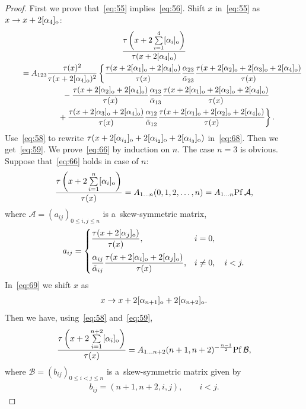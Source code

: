 \documentclass[11pt]{article}
\begin{document}
\begin{proof}
First we prove that~\eqref{eq:55} implies~\eqref{eq:56}.
Shift $x$ in~\eqref{eq:55} as $x\rightarrow x+2[\alpha_4]_{\rm o}$:
\begin{gather}
\frac{\tau\left(x+2\sum\limits_{i=1}^{4}[\alpha_i]_{\rm o}\right)}{\tau(x+2[\alpha_4]_{\rm o})}\nonumber\\
\qquad{}
=A_{123}\frac{\tau(x)^2}{\tau(x+2[\alpha_4]_{\rm o})^2}\left\{\frac{\tau(x+2[\alpha_1]_{\rm o}+2[\alpha_4]_{\rm o})}{\tau(x)}
\frac{\alpha_{23}}{\tilde{\alpha}_{23}}\frac{\tau(x+2[\alpha_2]_{\rm o}+2[\alpha_3]_{\rm o}+2[\alpha_4]_{\rm o})}{\tau(x)}
\right.
\nonumber
\\
\qquad\quad{} -\frac{\tau(x+2[\alpha_2]_{\rm o}+2[\alpha_4]_{\rm o})}{\tau(x)}\frac{\alpha_{13}}{\tilde{\alpha}_{13}}
\frac{\tau(x+2[\alpha_1]_{\rm o}+2[\alpha_3]_{\rm o}+2[\alpha_4]_{\rm o})}{\tau(x)}\nonumber
\\
 \left.
 \qquad\quad{} +\frac{\tau(x+2[\alpha_3]_{\rm o}+2[\alpha_4]_{\rm o})}{\tau(x)}\frac{\alpha_{12}}{\tilde{\alpha}_{12}}
\frac{\tau(x+2[\alpha_1]_{\rm o}+2[\alpha_2]_{\rm o}+2[\alpha_4]_{\rm o})}{\tau(x)}\right\}.
\label{eq:68}
\end{gather}
Use~\eqref{eq:58} to rewrite $\tau(x+2[\alpha_{i_1}]_{\rm o}+2[\alpha_{i_2}]_{\rm o}+2[\alpha_{i_3}]_{\rm o})$
in~\eqref{eq:68}.
Then we get~\eqref{eq:59}.
We prove~\eqref{eq:66} by induction on $n$.
The case $n=3$ is obvious.
Suppose that~\eqref{eq:66} holds in case of $n$:
\begin{gather}
\frac{\tau\left(x+2\sum\limits_{i=1}^{n}[\alpha_i]_{\rm o}\right)}{\tau(x)}=A_{1\dots n}(0,1,2,\dots,n)=A_{1\dots n}{\rm Pf}\, {\mathcal A},
\label{eq:69}
\end{gather}
where ${\mathcal A}=(a_{ij})_{0\le i,j\le n}$ is a~skew-symmetric matrix,
\begin{gather*}%
a_{ij}=
\begin{cases}\dfrac{\tau(x+2[\alpha_j]_{\rm o})}{\tau(x)}, &  i=0,
\vspace{2mm}\\
\dfrac{\alpha_{ij}}{{\tilde{\alpha}}_{ij}}\dfrac{\tau(x+2[\alpha_i]_{\rm o}+2[\alpha_j]_{\rm o})}{\tau(x)}
,&  i\neq0,\quad  i<j.
\end{cases}
\end{gather*}
In~\eqref{eq:69} we shift $x$ as
\begin{gather*}
x\rightarrow x+2[\alpha_{n+1}]_{\rm o}+2[\alpha_{n+2}]_{\rm o}.
\end{gather*}
Then we have, using~\eqref{eq:58} and~\eqref{eq:59},
\begin{gather}
\frac{\tau\left(x+2\sum\limits_{i=1}^{n+2}[\alpha_i]_{\rm o}\right)}{\tau(x)}=A_{1\dots n+2}(n+1,n+2)^{-\frac{n-1}{2}}{\rm Pf}\,
{\mathcal B},
\label{eq:71}
\end{gather}
where ${\mathcal B}=(b_{ij})_{0\le i<j\le n}$ is a~skew-symmetric matrix given by
\begin{gather*}%
b_{ij}=(n+1,n+2,i,j),\qquad  i<j .
\end{gather*}


\end{proof}
\end{document}
